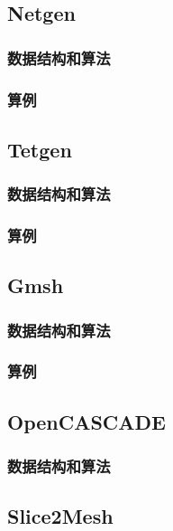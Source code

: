\subsection{Netgen}

\subsubsection{数据结构和算法}

\subsubsection{算例}

\subsection{Tetgen}

\subsubsection{数据结构和算法}

\subsubsection{算例}

\subsection{Gmsh}

\subsubsection{数据结构和算法}

\subsubsection{算例}

\subsection{OpenCASCADE}

\subsubsection{数据结构和算法}

\subsection{Slice2Mesh}

